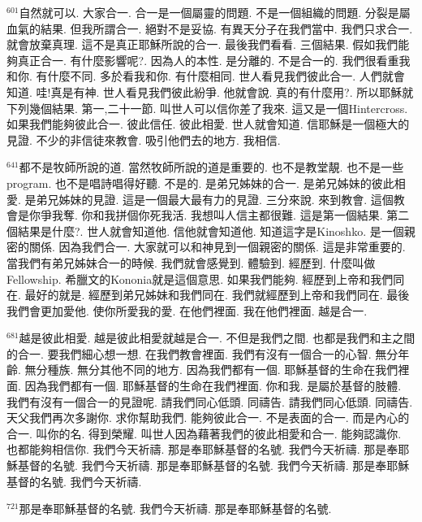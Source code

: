 \documentclass{book}
\begin{document}
$^{601}$自然就可以.
大家合一.
合一是一個屬靈的問題.
不是一個組織的問題.
分裂是屬血氣的結果.
但我所謂合一.
絕對不是妥協.
有異天分子在我們當中.
我們只求合一.
就會放棄真理.
這不是真正耶穌所說的合一.
最後我們看看.
三個結果.
假如我們能夠真正合一.
有什麼影響呢?.
因為人的本性.
是分離的.
不是合一的.
我們很看重我和你.
有什麼不同.
多於看我和你.
有什麼相同.
世人看見我們彼此合一.
人們就會知道.
哇!真是有神.
世人看見我們彼此紛爭.
他就會說.
真的有什麼用?.
所以耶穌就下列幾個結果.
第一,二十一節.
叫世人可以信你差了我來.
這又是一個Hintercross.
如果我們能夠彼此合一.
彼此信任.
彼此相愛.
世人就會知道.
信耶穌是一個極大的見證.
不少的非信徒來教會.
吸引他們去的地方.
我相信.

$^{641}$都不是牧師所說的道.
當然牧師所說的道是重要的.
也不是教堂靚.
也不是一些program.
也不是唱詩唱得好聽.
不是的.
是弟兄姊妹的合一.
是弟兄姊妹的彼此相愛.
是弟兄姊妹的見證.
這是一個最大最有力的見證.
三分來說.
來到教會.
這個教會是你爭我奪.
你和我拼個你死我活.
我想叫人信主都很難.
這是第一個結果.
第二個結果是什麼?.
世人就會知道他.
信他就會知道他.
知道這字是Kinoshko.
是一個親密的關係.
因為我們合一.
大家就可以和神見到一個親密的關係.
這是非常重要的.
當我們有弟兄姊妹合一的時候.
我們就會感覺到.
體驗到.
經歷到.
什麼叫做Fellowship.
希臘文的Kononia就是這個意思.
如果我們能夠.
經歷到上帝和我們同在.
最好的就是.
經歷到弟兄姊妹和我們同在.
我們就經歷到上帝和我們同在.
最後我們會更加愛他.
使你所愛我的愛.
在他們裡面.
我在他們裡面.
越是合一.

$^{681}$越是彼此相愛.
越是彼此相愛就越是合一.
不但是我們之間.
也都是我們和主之間的合一.
要我們細心想一想.
在我們教會裡面.
我們有沒有一個合一的心智.
無分年齡.
無分種族.
無分其他不同的地方.
因為我們都有一個.
耶穌基督的生命在我們裡面.
因為我們都有一個.
耶穌基督的生命在我們裡面.
你和我.
是屬於基督的肢體.
我們有沒有一個合一的見證呢.
請我們同心低頭.
同禱告.
請我們同心低頭.
同禱告.
天父我們再次多謝你.
求你幫助我們.
能夠彼此合一.
不是表面的合一.
而是內心的合一.
叫你的名.
得到榮耀.
叫世人因為藉著我們的彼此相愛和合一.
能夠認識你.
也都能夠相信你.
我們今天祈禱.
那是奉耶穌基督的名號.
我們今天祈禱.
那是奉耶穌基督的名號.
我們今天祈禱.
那是奉耶穌基督的名號.
我們今天祈禱.
那是奉耶穌基督的名號.
我們今天祈禱.

$^{721}$那是奉耶穌基督的名號.
我們今天祈禱.
那是奉耶穌基督的名號.
\newpage
\end{document}
